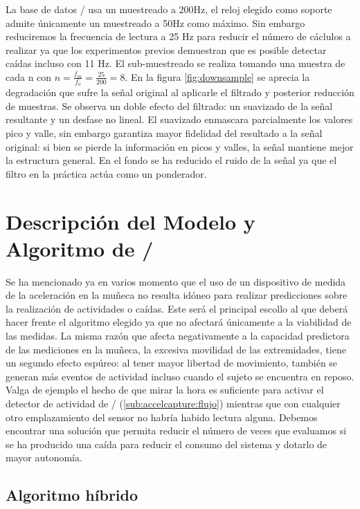 La base de datos \sisfall/ usa un muestreado a 200Hz, el reloj elegido como soporte admite únicamente un muestreado a 50Hz como máximo. Sin embargo reduciremos la frecuencia de lectura a 25 Hz para reducir el número de cáclulos a realizar ya que los experimentos previos demuestran que es posible detectar caídas incluso con 11 Hz. El sub-muestreado se realiza tomando una muestra de cada n con $n=\frac{f_m}{f_o}=\frac{25}{200}=8$. En la figura \ref{fig:downsample} se aprecia la degradación que sufre la señal original al aplicarle el filtrado y posterior reducción de muestras. Se observa un doble efecto del filtrado: un suavizado de la señal resultante y un desfase no lineal. El suavizado enmascara parcialmente los valores pico y valle, sin embargo garantiza mayor fidelidad del resultado a la señal original: si bien se pierde la información en picos y valles, la señal mantiene mejor la estructura general. En el fondo se ha reducido el ruido de la señal ya que el filtro en la práctica actúa como un ponderador.


\section{Descripción del Modelo y Algoritmo de \ifell/}\label{sec:imp:model}

Se ha mencionado ya en varios momento que el uso de un dispositivo de medida de la aceleración en la muñeca no resulta idóneo para realizar predicciones sobre la realización de actividades o caídas. Este será el principal escollo al que deberá hacer frente el algoritmo elegido ya que no afectará únicamente a la viabilidad de las medidas. La misma razón que afecta negativamente a la capacidad predictora de las mediciones en la muñeca, la excesiva movilidad de las extremidades, tiene un segundo efecto espúreo: al tener mayor libertad de movimiento, también se generan más eventos de actividad incluso cuando el sujeto se encuentra en reposo. Valga de ejemplo el hecho de que mirar la hora es suficiente para activar el detector de actividad de \accelcapture/ (\autoref{sub:accelcapture:flujo}) mientras que con cualquier otro emplazamiento del sensor no habría habido lectura alguna. Debemos encontrar una solución que permita reducir el número de veces que evaluamos si se ha producido una caída para reducir el consumo del sistema y dotarlo de mayor autonomía.

\subsection{Algoritmo híbrido}\label{sub:imp:model:algoritmo}

